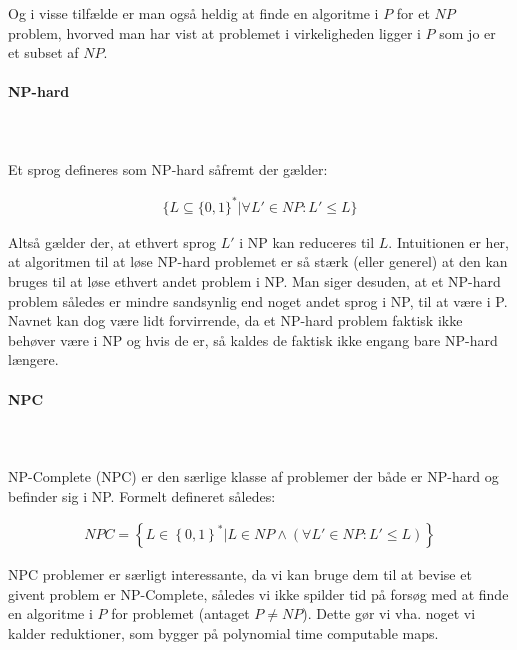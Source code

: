 Og i visse tilfælde er man også heldig at finde en algoritme i $P$ for
et $NP$ problem, hvorved man har vist at problemet i virkeligheden
ligger i $P$ som jo er et subset af $NP$.

\paragraph{NP-hard}
~\\
~\\
Et sprog defineres som NP-hard såfremt der gælder:

\begin{align*}
 \lbrace L \subseteq \lbrace 0,1 \rbrace^* | \forall L' \in NP: L' \leq L \rbrace
\end{align*}

Altså gælder der, at ethvert sprog $L'$ i NP kan reduceres til $L$.
Intuitionen er her, at algoritmen til at løse NP-hard problemet er så stærk
(eller generel) at den kan bruges til at løse ethvert andet problem i NP. Man
siger desuden, at et NP-hard problem således er mindre sandsynlig end noget
andet sprog i NP, til at være i P.\\

Navnet kan dog være lidt forvirrende, da et NP-hard problem faktisk
ikke behøver være i NP og hvis de er, så kaldes de faktisk ikke engang
bare NP-hard længere.

\paragraph{NPC}
~\\
~\\
NP-Complete (NPC) er den særlige klasse af problemer der både er
NP-hard og befinder sig i NP. Formelt defineret således:

\begin{align*}
 NPC = \left\lbrace L \in \left\lbrace 0,1 \right\rbrace^* | L \in NP \wedge
(\forall L' \in NP: L' \leq L) \right\rbrace
\end{align*}

NPC problemer er særligt interessante, da vi kan bruge dem til at
bevise et givent problem er NP-Complete, således vi ikke spilder tid
på forsøg med at finde en algoritme i $P$ for problemet (antaget
$P\neq NP$). Dette gør vi vha.  noget vi kalder reduktioner, som
bygger på polynomial time computable maps.

